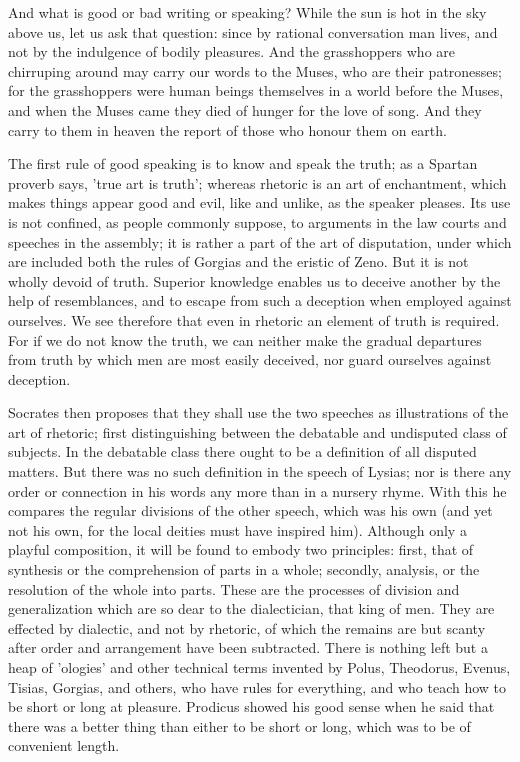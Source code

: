 \documentclass[11pt,letter]{article}
\begin{document}
\par  And what is good or bad writing or speaking? While the sun is hot in the sky above us, let us ask that question: since by rational conversation man lives, and not by the indulgence of bodily pleasures. And the grasshoppers who are chirruping around may carry our words to the Muses, who are their patronesses; for the grasshoppers were human beings themselves in a world before the Muses, and when the Muses came they died of hunger for the love of song. And they carry to them in heaven the report of those who honour them on earth.

\par  The first rule of good speaking is to know and speak the truth; as a Spartan proverb says, 'true art is truth'; whereas rhetoric is an art of enchantment, which makes things appear good and evil, like and unlike, as the speaker pleases. Its use is not confined, as people commonly suppose, to arguments in the law courts and speeches in the assembly; it is rather a part of the art of disputation, under which are included both the rules of Gorgias and the eristic of Zeno. But it is not wholly devoid of truth. Superior knowledge enables us to deceive another by the help of resemblances, and to escape from such a deception when employed against ourselves. We see therefore that even in rhetoric an element of truth is required. For if we do not know the truth, we can neither make the gradual departures from truth by which men are most easily deceived, nor guard ourselves against deception.

\par  Socrates then proposes that they shall use the two speeches as illustrations of the art of rhetoric; first distinguishing between the debatable and undisputed class of subjects. In the debatable class there ought to be a definition of all disputed matters. But there was no such definition in the speech of Lysias; nor is there any order or connection in his words any more than in a nursery rhyme. With this he compares the regular divisions of the other speech, which was his own (and yet not his own, for the local deities must have inspired him). Although only a playful composition, it will be found to embody two principles: first, that of synthesis or the comprehension of parts in a whole; secondly, analysis, or the resolution of the whole into parts. These are the processes of division and generalization which are so dear to the dialectician, that king of men. They are effected by dialectic, and not by rhetoric, of which the remains are but scanty after order and arrangement have been subtracted. There is nothing left but a heap of 'ologies' and other technical terms invented by Polus, Theodorus, Evenus, Tisias, Gorgias, and others, who have rules for everything, and who teach how to be short or long at pleasure. Prodicus showed his good sense when he said that there was a better thing than either to be short or long, which was to be of convenient length.
\end{document}
